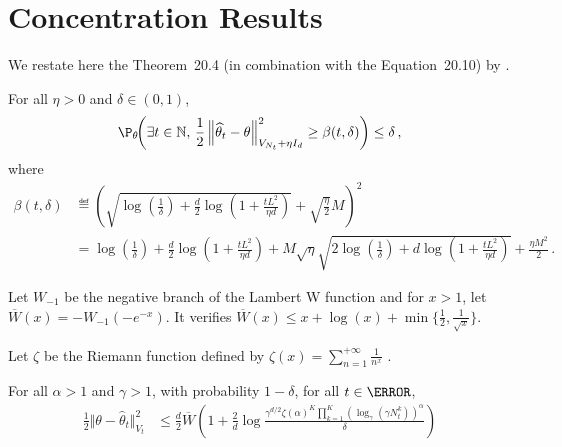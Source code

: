 \section{Concentration Results}\label{app:lgc.concentration}

We restate here the Theorem~20.4 (in combination with the Equation~20.10) by \citet{lattimore2018bandits}.
\begin{theorem}
\label{th:confidence_beta}
For all $\eta >0$ and $\delta\in(0,1)$,
\[
\P_{\theta}\!\!\left(\exists t\in\NN,\, \frac{1}{2}\normm{\htheta_t-\theta}^2_{V_{N_t}+\eta I_d} \geq \beta(t,\delta)\right) \leq \delta\,,
 \]
 where
 \begin{align*}
\beta(t,\delta) &\eqdef  \left( \sqrt{\log\!\left( \frac{1}{\delta}\right)+\frac{d}{2}\log\!\left(1+\frac{t L^2}{\eta d} \right)} +\sqrt{\frac{\eta}{2}}M\right)^2\\
&=\log\!\left( \frac{1}{\delta}\right)+\frac{d}{2}\log\!\left(1+\frac{t L^2}{\eta d} \right) +  M\sqrt{\eta}\sqrt{2\log\!\left( \frac{1}{\delta}\right)+d\log\!\left(1+\frac{t L^2}{\eta d} \right)}+\frac{\eta M^2}{2}\,.
\end{align*}
\end{theorem}


\iffalse
Let $W_{-1}$ be the negative branch of the Lambert W function and for $x>1$, let $\overline{W}(x) = -W_{-1}(-e^{-x})$. It verifies $\overline{W}(x) \le x + \log(x) + \min\{\frac{1}{2}, \frac{1}{\sqrt{x}}\}$.

Let $\zeta$ be the Riemann function defined by $\zeta(x) = \sum_{n=1}^{+\infty}\frac{1}{n^x}$ .

\begin{theorem}\label{thm:maximal_concentration_inequality}
For all $\alpha>1$ and $\gamma>1$, with probability $1-\delta$, for all $t\in \N$,
\begin{align*}
\frac{1}{2} \Vert \theta - \hat{\theta}_t \Vert_{V_t}^2
&\le \frac{d}{2} \overline{W}\left( 1 + \frac{2}{d}\log \frac{\gamma^{d/2}\zeta(\alpha)^K\prod_{k=1}^K(\log_\gamma(\gamma N_t^k))^\alpha}{\delta} \right)
\end{align*}
\end{theorem}


